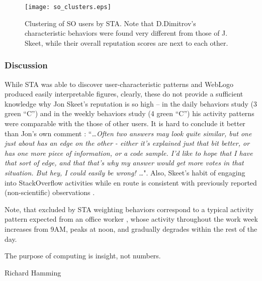 \begin{figure}[t]
   \centering
   \texttt{[image: so\_clusters.eps]}
   \caption{Clustering of SO users by STA. Note that D.Dimitrov's characteristic behaviors were found very different from those of J. Skeet, while their overall reputation scores are next to each other.}
   \label{fig:stack_clusters}   
\end{figure}

\subsubsection{Discussion}
While STA was able to discover user-characteristic patterns and WebLogo produced easily interpretable figures, clearly, these do not provide a sufficient knowledge why Jon Skeet's reputation is so high -- in the daily behaviors study (3 green ``C'') and in the weekly behaviors study (4 green ``C'') his activity patterns were comparable with the those of other users. It is hard to conclude it better than Jon's own comment \cite{skeet}: ``\textit{\dots Often two answers may look quite similar, but one just about has an edge on the other - either it's explained just that bit better, or has one more piece of information, or a code sample. I'd like to hope that I have that sort of edge, and that that's why my answer would get more votes in that situation. But hey, I could easily be wrong! \dots}". Also, Skeet's habit of engaging into StackOverflow activities while en route is consistent with previously reported (non-scientific) observations \cite{tharp_habit}.

Note, that excluded by STA weighting behaviors correspond to a typical activity pattern expected from an office worker \cite{activity_patterns}, whose activity throughout the work week increases from 9AM, peaks at noon, and gradually degrades within the rest of the day.


\epigraph{The purpose of computing is insight, not numbers.}{Richard Hamming}
